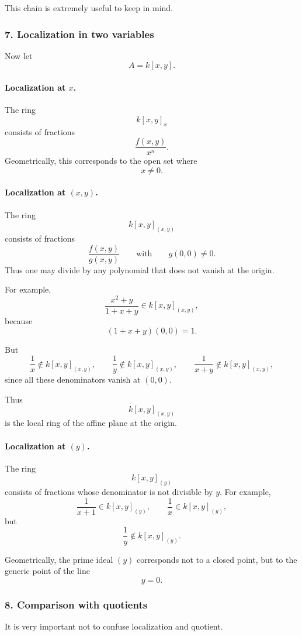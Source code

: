 \documentclass[12pt,a4paper]{article}
\theoremstyle{notespace}
\theoremstyle{definition}
\begin{document}
This chain is extremely useful to keep in mind.

\subsubsection{7. Localization in two variables}

Now let
\[
A=k[x,y].
\]

\paragraph{Localization at \(x\).}
The ring
\[
k[x,y]_x
\]
consists of fractions
\[
\frac{f(x,y)}{x^n}.
\]
Geometrically, this corresponds to the open set where
\[
x\neq 0.
\]

\paragraph{Localization at \((x,y)\).}
The ring
\[
k[x,y]_{(x,y)}
\]
consists of fractions
\[
\frac{f(x,y)}{g(x,y)}
\qquad\text{with}\qquad g(0,0)\neq 0.
\]
Thus one may divide by any polynomial that does not vanish at the origin.

For example,
\[
\frac{x^2+y}{1+x+y}\in k[x,y]_{(x,y)},
\]
because
\[
(1+x+y)(0,0)=1.
\]

But
\[
\frac{1}{x}\notin k[x,y]_{(x,y)},
\qquad
\frac{1}{y}\notin k[x,y]_{(x,y)},
\qquad
\frac{1}{x+y}\notin k[x,y]_{(x,y)},
\]
since all these denominators vanish at \((0,0)\).

Thus
\[
k[x,y]_{(x,y)}
\]
is the local ring of the affine plane at the origin.

\paragraph{Localization at \((y)\).}
The ring
\[
k[x,y]_{(y)}
\]
consists of fractions whose denominator is not divisible by \(y\). For example,
\[
\frac{1}{x+1}\in k[x,y]_{(y)},
\qquad
\frac{1}{x}\in k[x,y]_{(y)},
\]
but
\[
\frac{1}{y}\notin k[x,y]_{(y)}.
\]

Geometrically, the prime ideal \((y)\) corresponds not to a closed point, but to the generic point of the line
\[
y=0.
\]

\subsubsection{8. Comparison with quotients}

It is very important not to confuse localization and quotient.
\end{document}
